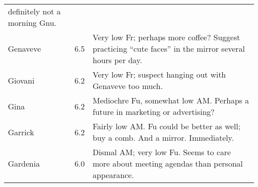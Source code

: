 \begin{landscape}
\begin{longtable}{lcp{4.5in}}
  definitely not a morning Gnu. \\ 
Genaveve & 6.5 & Very low Fr; perhaps more coffee?  Suggest practicing
  ``cute faces'' in the mirror several hours per day.  \\
Giovani & 6.2 & Very low Fr; suspect hanging out with Genaveve too
  much. \\
Gina & 6.2 & Mediochre Fu, somewhat low AM.  Perhaps a future in
  marketing or advertising? \\
Garrick & 6.2 & Fairly low AM.  Fu could be better as well; buy a
  comb.  And a mirror.  Immediately.  \\
Gardenia & 6.0 & Dismal AM; very low Fu.  Seems to care more about
  meeting agendas than personal appearance. \\
\end{longtable}
\end{landscape}


%
% 
% 